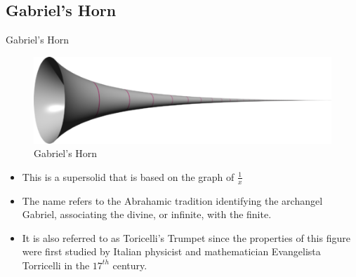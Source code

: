 \documentclass{beamer}
\begin{document}
\subsection{Gabriel's Horn}

\begin{frame}{Gabriel's Horn}

    \begin{figure}
        \centering
        \includegraphics[width=\linewidth]{horn1.png}
        \caption{Gabriel's Horn}
        \label{fig:my_label}
    \end{figure}
    \begin{itemize}
        \item This is a supersolid that is based on the graph of $\frac{1}{x}$
        \item The name refers to the Abrahamic tradition identifying the archangel Gabriel, associating the divine, or infinite, with the finite.
        \item It is also referred to as Toricelli's Trumpet since the properties of this figure were first studied by Italian physicist and mathematician Evangelista Torricelli in the $17^{th}$ century.
    \end{itemize}
\end{frame}
\end{document}
